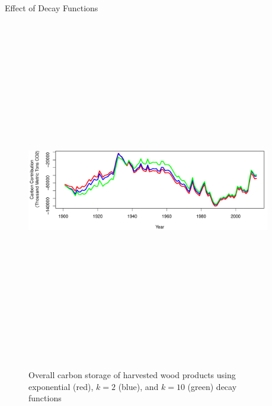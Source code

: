 \documentclass[final]{beamer}\usepackage[]{graphicx}\usepackage[]{color}
\newlength{\sepwid}
\newlength{\onecolwid}
\newlength{\twocolwid}
\begin{document}
\begin{frame}[t]
\begin{columns}[t]
\begin{column}{\twocolwid}
\begin{columns}[t,totalwidth=\twocolwid]
\begin{column}{\onecolwid}
\begin{block}{Effect of Decay Functions}
\begin{center}
\vspace{-2cm}
\begin{figure}
    {\includegraphics[width=1\linewidth, height=15cm]{DecayPlotOverall.pdf}}
    \caption{Overall carbon storage of harvested wood products using exponential (red), $k=2$ (blue), and $k=10$ (green) decay functions}
\end{figure}
\end{center}

\end{block}


\end{column} %

\end{columns} %

\end{column} %

\begin{column}{\sepwid}\end{column} %


\end{columns}
\end{frame}
\end{document}
